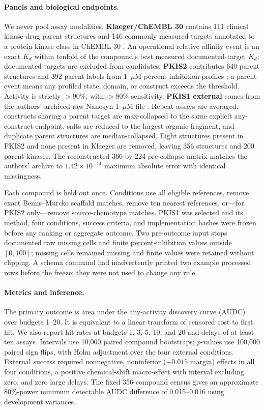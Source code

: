 \documentclass{article}
\begin{document}
\paragraph{Panels and biological endpoints.}
We never pool assay modalities. \textbf{Klaeger/ChEMBL 30} contains 111
clinical kinase-drug parent structures and 146 commonly measured targets
annotated to a protein-kinase class in ChEMBL 30
\citep{klaeger2017,zdrazil2024}. An operational relative-affinity event is an
exact $K_d$ within tenfold of the compound's best measured documented-target $K_d$;
documented targets are excluded from candidates. \textbf{PKIS2} contributes
640 parent structures and 392 parent labels from 1~$\mu$M percent-inhibition
profiles \citep{drewry2017}; a parent event means any profiled state, domain,
or construct exceeds the threshold. Activity is strictly $>90\%$, with $>80\%$
sensitivity. \textbf{PKIS1 external} comes from the authors' archived raw
Nanosyn 1~$\mu$M file \citep{elkins2016,zhang2019}. Repeat assays are averaged,
constructs sharing a parent target are max-collapsed to the same explicit
any-construct endpoint, salts are reduced to the
largest organic fragment, and duplicate parent structures are median-collapsed.
Eight structures present in PKIS2 and none present in Klaeger are removed,
leaving 356 structures and 200 parent kinases. The reconstructed 366-by-224
pre-collapse matrix matches the authors' archive to $1.42\times10^{-14}$
maximum absolute error with identical missingness.

Each compound is held out once. Conditions use all eligible references, remove
exact Bemis--Murcko scaffold matches, remove ten nearest references, or---for
PKIS2 only---remove source-chemotype matches. PKIS1 was selected and its method,
four conditions, success criteria, and implementation hashes were frozen before
any ranking or aggregate outcome. Two pre-outcome input stops documented raw
missing cells and finite percent-inhibition values outside $[0,100]$; missing
cells remained missing and finite values were retained without clipping. A
schema command had inadvertently printed two example processed rows before the
freeze; they were not used to change any rule.

\paragraph{Metrics and inference.}
The primary outcome is area under the any-activity discovery curve (AUDC) over
budgets 1--20. It is equivalent to a linear transform of censored cost to
first hit. We also report hit rates at budgets 1, 3, 5, 10, and 20 and delays
of at least ten assays. Intervals use 10,000 paired compound bootstraps;
$p$-values use 100,000 paired sign flips, with Holm adjustment over the four
external conditions. External success required nonnegative, noninferior
($-0.015$ margin) effects in all four conditions, a positive chemical-shift
macro-effect with interval excluding zero, and zero large delays. The fixed
356-compound census gives an approximate 80\%-power minimum detectable AUDC
difference of 0.015--0.016 using development variances.
\end{document}
